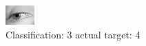 \begin{figure}[h!]
\begin{center}
\includegraphics[width=0.60\columnwidth]{figures/ID2969_class_3_target_4.png}
\end{center}
\caption{ Classification: 3 actual target: 4}
\label{fig:ID2969_class_3_target_4}
\end{figure}
